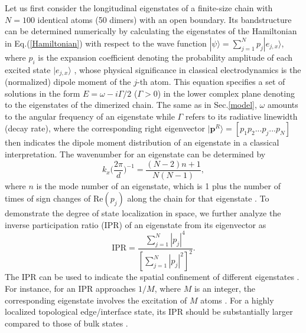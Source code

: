 \documentclass[aps,pra,reprint,groupedaddress,nofootinbib,longbibliography,showpacs]{revtex4-1}
\begin{document}
Let us first consider the longitudinal eigenstates of a finite-size chain with $N=100$ identical atoms (50 dimers) with an open boundary. Its bandstructure can be determined numerically by calculating the eigenstates of the Hamiltonian in Eq.(\ref{Hamiltonian}) with respect to the wave function $|\psi\rangle=\sum_{j=1}^{N}p_{j}|e_{j,x}\rangle$, where $p_{i}$ is the expansion coefficient denoting the probability amplitude of each excited state $|e_{j,x}\rangle$ \cite{weberPRB2004,guerinPRL2016,kaiserFP2012,kaiserJMO2011}, whose physical significance in classical electrodynamics is the (normalized) dipole moment of the $j$-th atom. This equation specifies a set of solutions in the form $E=\omega-i\Gamma/2$ ($\Gamma>0$) in the lower complex plane denoting to the eigenstates of the dimerized chain. The same as in Sec.\ref{model}, $\omega$ amounts to the angular frequency of an eigenstate while $\Gamma$ refers to its radiative linewidth (decay rate), where the corresponding right eigenvector $|\mathbf{p}^R\rangle=[p_1p_2...p_j...p_N]$ then indicates the dipole moment distribution of an eigenstate in a classical interpretation. The wavenumber for an eigenstate can be determined by \cite{weberPRB2004,pocockArxiv2017}
\begin{equation}
k_x\Big(\frac{2\pi}{d}\Big)^{-1}=\frac{(N-2)n+1}{N(N-1)},
\end{equation}
where $n$ is the mode number of an eigenstate, which is 1 plus the number of times of sign changes of $\mathrm{Re}(p_j)$ along the chain for that eigenstate \cite{weberPRB2004,pocockArxiv2017}. To demonstrate the degree of state localization in space, we further analyze the inverse participation ratio (IPR) of an eigenstate from its eigenvector as \cite{wangOL2018}
\begin{equation}
\mathrm{IPR}=\frac{\sum_{j=1}^{N}|p_j|^4}{[\sum_{j=1}^{N}|p_j|^2]^2}.
\end{equation}
The IPR can be used to indicate the spatial confinement of different eigenstates \cite{Skipetrov2014,wangOL2018}. For instance, for an IPR approaches $1/M$, where $M$ is an integer, the corresponding eigenstate involves the excitation of $M$ atoms \cite{Skipetrov2014,wangOL2018}. For a highly localized topological edge/interface state, its IPR should be substantially larger compared to those of bulk states \cite{wangOL2018}. 
\end{document}
